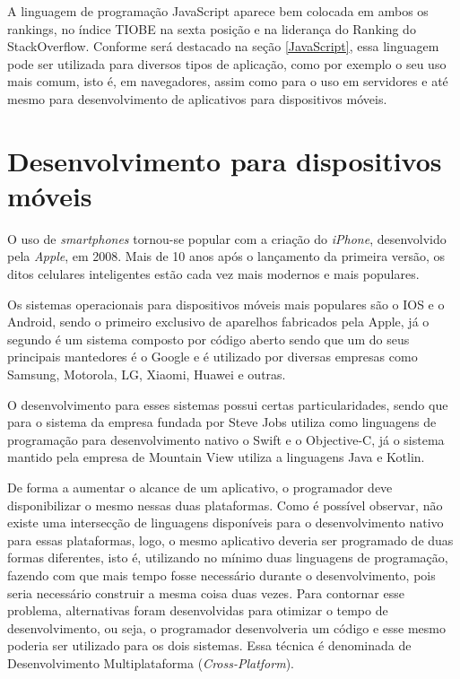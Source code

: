 A linguagem de programação JavaScript aparece bem colocada em ambos os rankings, no índice TIOBE na sexta posição e na liderança do Ranking do StackOverflow. Conforme será destacado na seção \ref{JavaScript}, essa linguagem pode ser utilizada para diversos tipos de aplicação, como por exemplo o seu uso mais comum, isto é, em navegadores, assim como para o uso em servidores e até mesmo para desenvolvimento de aplicativos para dispositivos móveis.

\section{Desenvolvimento para dispositivos móveis}
\label{sec-desenvolvimento-apps}

O uso de \textit{smartphones} tornou-se popular com a criação do \textit{iPhone}, desenvolvido pela \textit{Apple}, em 2008. Mais de 10 anos após o lançamento da primeira versão, os ditos celulares inteligentes estão cada vez mais modernos e mais populares.


Os sistemas operacionais para dispositivos móveis mais populares são o IOS e o Android, sendo o primeiro exclusivo de aparelhos fabricados pela Apple, já o segundo é um sistema composto por código aberto sendo que um do seus principais mantedores é o Google e é utilizado por diversas empresas como Samsung, Motorola, LG, Xiaomi, Huawei e outras.

O desenvolvimento para esses sistemas possui certas particularidades, sendo que para o sistema da empresa fundada por Steve Jobs utiliza como linguagens de programação para desenvolvimento nativo o Swift e o Objective-C, já o sistema mantido pela empresa de Mountain View utiliza a linguagens Java e Kotlin.

De forma a aumentar o alcance de um aplicativo, o programador deve disponibilizar o mesmo nessas duas plataformas. Como é possível observar, não existe uma intersecção de linguagens disponíveis para o desenvolvimento nativo para essas plataformas, logo, o mesmo aplicativo deveria ser programado de duas formas diferentes, isto é, utilizando no mínimo duas linguagens de programação, fazendo com que mais tempo fosse necessário durante o desenvolvimento, pois seria necessário construir a mesma coisa duas vezes. Para contornar esse problema, alternativas foram desenvolvidas para otimizar o tempo de desenvolvimento, ou seja, o programador desenvolveria um código e esse mesmo poderia ser utilizado para os dois sistemas. Essa técnica é denominada de Desenvolvimento Multiplataforma (\textit{Cross-Platform}).

